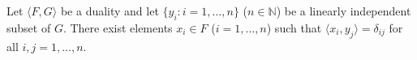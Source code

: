 Let $\langle F, G \rangle$ be a duality and let $\{y_i: i = 1, \ldots, n\}$ ($n \in \mathbb{N}$) be a linearly independent subset of $G$. There exist elements $x_i \in F$ ($i = 1, \ldots, n$) such that $\langle x_i, y_j \rangle = \delta_{ij}$ for all $i, j = 1, \ldots, n$.
